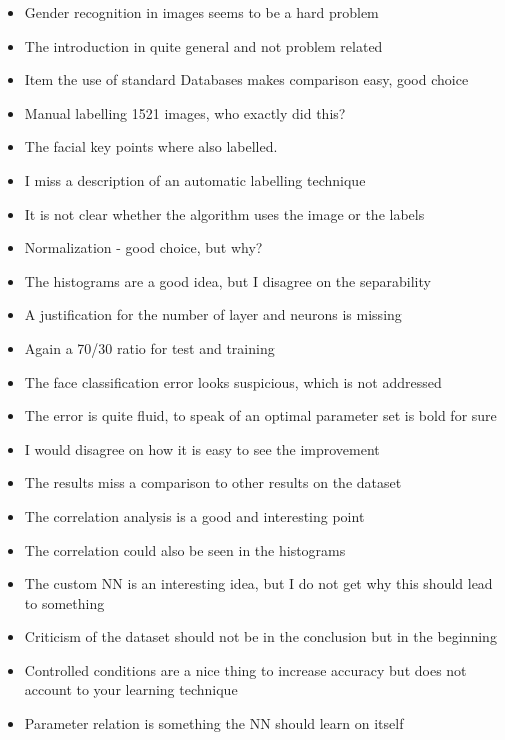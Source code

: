 \documentclass[	DIV=calc,%
				paper=a4,%
				fontsize=11pt,%
				twocolumn]{scrartcl}	 %
\begin{document}
\begin{itemize}
\item Gender recognition in images seems to be a hard problem
\item The introduction in quite general and not problem related
\item Item the use of standard Databases makes comparison easy, good choice
\item Manual labelling 1521 images, who exactly did this?
\item The facial key points where also labelled.
\item I miss a description of an automatic labelling technique
\item It is not clear whether the algorithm uses the image or the labels
\item  Normalization - good choice, but why?
\item The histograms are a good idea, but I disagree on the separability\
\item A justification for the number of layer and neurons is missing
\item Again a 70/30 ratio for test and training
\item The face classification error looks suspicious, which is not addressed
\item The error is quite fluid, to speak of an optimal parameter set is bold for sure
\item I would disagree on how it is easy to see the improvement
\item The results miss a comparison to other results on the dataset
\item The correlation analysis is a good and interesting point
\item The correlation could also be seen in the histograms
\item The custom NN is an interesting idea, but I do not get why this should lead to something
\item Criticism of the dataset should not be in the conclusion but in the beginning
\item Controlled conditions are a nice thing to increase accuracy but does not account to your learning technique
\item Parameter relation is something the NN should learn on itself
\end{itemize}
\end{document}

